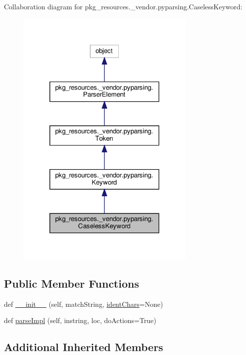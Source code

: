 Collaboration diagram for pkg\+\_\+resources.\+\_\+vendor.\+pyparsing.\+Caseless\+Keyword\+:
\nopagebreak
\begin{figure}[H]
\begin{center}
\leavevmode
\includegraphics[width=246pt]{classpkg__resources_1_1__vendor_1_1pyparsing_1_1CaselessKeyword__coll__graph}
\end{center}
\end{figure}
\subsection*{Public Member Functions}
\begin{DoxyCompactItemize}
\item 
def \hyperlink{classpkg__resources_1_1__vendor_1_1pyparsing_1_1CaselessKeyword_a76b2716edd2626af7bad541555b41152}{\+\_\+\+\_\+init\+\_\+\+\_\+} (self, match\+String, \hyperlink{classpkg__resources_1_1__vendor_1_1pyparsing_1_1Keyword_a7a7ddf827885e3eba8c0d9f7cb22a336}{ident\+Chars}=None)
\item 
def \hyperlink{classpkg__resources_1_1__vendor_1_1pyparsing_1_1CaselessKeyword_a2d91f035d202ecdbbb70996640906bda}{parse\+Impl} (self, instring, loc, do\+Actions=True)
\end{DoxyCompactItemize}
\subsection*{Additional Inherited Members}


